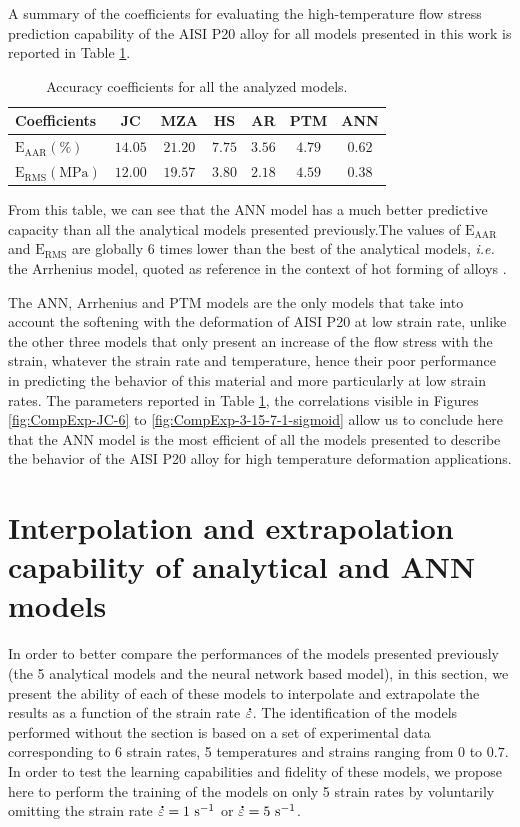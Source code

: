 \documentclass[twoside,english,1p,final,sort&compress]{elsarticle}
\makeatletter
\theoremstyle{plain}
\DeclareRobustCommand{\mdot}[1]{\accentset{\mbox{\bfseries .}}{#1}}
\DeclareRobustCommand{\ie}{\emph{i.e.}\@\xspace}
\DeclareRobustCommand{\RMSE}{\text{E}_\text{RMS}}
\DeclareRobustCommand{\AARE}{\text{E}_\text{AAR}}
\DeclareRobustCommand{\ps}{\text{s}^{-1}}
\makeatother
\begin{document}
A summary of the coefficients for evaluating the high-temperature flow stress prediction capability of the AISI P20 alloy for all models presented in this work is reported in Table \ref{tab:Errors}.
\begin{table}[h!]
\centering
\caption{Accuracy coefficients for all the analyzed models.}
\begin{tabular}{lcccccc}
	\hline
	Coefficients        &   JC    &   MZA   &   HS   &   AR   &  PTM   &  ANN   \\ \hline
	$\AARE(\%)$         & $14.05$ & $21.20$ & $7.75$ & $3.56$ & $4.79$ & $0.62$ \\
	$\RMSE(\text{MPa})$ & $12.00$ & $19.57$ & $3.80$ & $2.18$ & $4.59$ & $0.38$ \\ \hline
\end{tabular}
\label{tab:Errors}
\end{table}
From this table, we can see that the ANN model has a much better predictive capacity than all the analytical models presented previously.The values of $\AARE$ and $\RMSE$ are globally 6 times lower than the best of the analytical models, \ie the Arrhenius model, quoted as reference in the context of hot forming of alloys \cite{Liang-2022}.

The ANN, Arrhenius and PTM models are the only models that take into account the softening with the deformation of AISI P20 at low strain rate, unlike the other three models that only present an increase of the flow stress with the strain, whatever the strain rate and temperature, hence their poor performance in predicting the behavior of this material and more particularly at low strain rates.
The parameters reported in Table \ref{tab:Errors}, the correlations visible in Figures \ref{fig:CompExp-JC-6} to \ref{fig:CompExp-3-15-7-1-sigmoid} allow us to conclude here that the ANN model is the most efficient of all the models presented to describe the behavior of the AISI P20 alloy for high temperature deformation applications.

\section{Interpolation and extrapolation capability of analytical and ANN models \label{sec:IntExt}}

In order to better compare the performances of the models presented previously (the 5 analytical models and the neural network based model), in this section, we present the ability of each of these models to interpolate and extrapolate the results as a function of the strain rate $\mdot\varepsilon$.
The identification of the models performed without the section is based on a set of experimental data corresponding to 6 strain rates, 5 temperatures and strains ranging from $0$ to $0.7$.
In order to test the learning capabilities and fidelity of these models, we propose here to perform the training of the models on only 5 strain rates by voluntarily omitting the strain rate $\mdot\varepsilon=1~\ps$ or $\mdot\varepsilon=5~\ps$.
\end{document}
